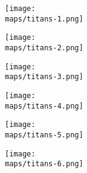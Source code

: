 \begin{minipage}{0.4\paperwidth}
  \centering
  \texttt{[image: \\maps/titans-1.png]}
\end{minipage}
\begin{minipage}{0.4\paperwidth}
  \centering
  \texttt{[image: \\maps/titans-2.png]}
\end{minipage}
\vspace{1em}
\linebreak
\begin{minipage}{0.4\paperwidth}
  \centering
  \texttt{[image: \\maps/titans-3.png]}
\end{minipage}
\begin{minipage}{0.4\paperwidth}
  \centering
  \texttt{[image: \\maps/titans-4.png]}
\end{minipage}
\vspace{1em}
\linebreak
\begin{minipage}{0.4\paperwidth}
  \centering
  \texttt{[image: \\maps/titans-5.png]}
\end{minipage}
\begin{minipage}{0.4\paperwidth}
  \centering
  \texttt{[image: \\maps/titans-6.png]}
\end{minipage}
